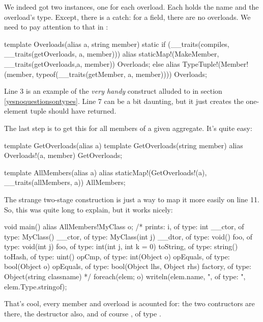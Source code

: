 We indeed got two  instances, one for each overload. Each  holds the name  and the overload's type. Except, there is a catch: for a field, there are no overloads. We need to pay attention to that in :

\begin{dcode}
template Overloads(alias a, string member)
{
    static if (__traits(compiles, __traits(getOverloads, a, member)))
        alias staticMap!(MakeMember, __traits(getOverloads,a, member))
              Overloads;
    else
        alias TypeTuple!(Member!(member, typeof(__traits(getMember, a, member)))) 
              Overloads;
}
\end{dcode}

Line 3 is an example of the \emph{very handy}  construct alluded to in section \ref{yesnoquestionsontypes}. Line 7 can be a bit daunting, but it just creates the one-element tuple  should have returned.

The last step is to get this for all members of a given aggregate. It's quite easy:

\begin{dcode}
template GetOverloads(alias a)
{
    template GetOverloads(string member)
    {
        alias Overloads!(a, member) GetOverloads;
    }
}

template AllMembers(alias a)
{
    alias staticMap!(GetOverloads!(a), __traits(allMembers, a)) AllMembers; 
}
\end{dcode}

The strange  two-stage construction is just a way to map it more easily on line 11. So, this was quite long to explain, but it works nicely:

\begin{dcode}
void main()
{
    alias AllMembers!MyClass o;
    /*
    prints:
    i, of type: int
    __ctor, of type: MyClass()
    __ctor, of type: MyClass(int j)
    __dtor, of type: void()
    foo, of type: void(int j)
    foo, of type: int(int j, int k = 0)
    toString, of type: string()
    toHash, of type: uint()
    opCmp, of type: int(Object o)
    opEquals, of type: bool(Object o)
    opEquals, of type: bool(Object lhs, Object rhs)
    factory, of type: Object(string classname)
    */
    foreach(elem; o) 
        writeln(elem.name, ", of type: ", elem.Type.stringof);    
}
\end{dcode}

That's cool, every member and overload is acounted for: the two contructors are there, the destructor also, and of course , of type .

